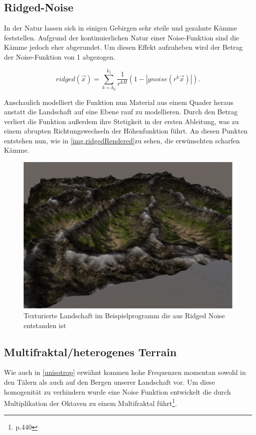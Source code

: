 \subsection{Ridged-Noise}
In der Natur lassen sich in einigen Gebirgen sehr steile und gezahnte Kämme feststellen. Aufgrund der kontinuierlichen Natur einer Noise-Funktion sind die Kämme jedoch eher abgerundet. 
Um diesen Effekt aufzuheben wird der Betrag der Noise-Funktion von 1 abgezogen. 

\begin{equation} \label{eq.ridgedNoise}
ridged(\vec{x}) = \sum_{k=k_0}^{k_1}\frac{1}{r^{kH}}(1-\left|gnoise(r^k\vec{x})\right|).
\end{equation}

Anschaulich modelliert die Funktion nun Material aus einem Quader heraus anstatt die Landschaft auf eine Ebene rauf zu modellieren. Durch den Betrag verliert die Funktion außerdem ihre Stetigkeit in der ersten Ableitung, was zu einem abrupten Richtungswechseln der Höhenfunktion führt. An diesen Punkten entstehen nun, wie in \autoref{img.ridgedRendered}zu sehen, die erwünschten scharfen Kämme.

\begin{figure}
	\centering
	\includegraphics[width=\textwidth]{images/ridged_rendered.png}
	\caption{Texturierte Landschaft im Beispielprogramm die aus Ridged Noise entstanden ist}\label{img.ridgedRendered}
\end{figure}



\subsection{Multifraktal/heterogenes Terrain}
Wie auch in \ref{unisotrop} erwähnt kommen hohe Frequenzen momentan sowohl in den Tälern als auch auf den Bergen unserer Landschaft vor. Um diese homogenität zu verhindern wurde eine Noise Funktion entwickelt die durch Multiplikation der Oktaven zu einem Multifraktal führt\footnote{\cite{texturingAndModeling} p.440}. 

